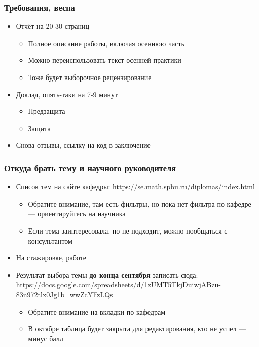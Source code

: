 \documentclass{../../slides-style}
\begin{document}
    \begin{frame}
        \frametitle{Требования, весна}
        \begin{itemize}
            \item Отчёт на 20-30 страниц
            \begin{itemize}
                \item Полное описание работы, включая осеннюю часть
                \item Можно переиспользовать текст осенней практики
                \item Тоже будет выборочное рецензирование
            \end{itemize}
            \item Доклад, опять-таки на 7-9 минут
            \begin{itemize}
                \item Предзащита
                \item Защита
            \end{itemize}
            \item Снова отзывы, ссылку на код в заключение
        \end{itemize}
    \end{frame}

    \begin{frame}
        \frametitle{Откуда брать тему и научного руководителя}
        \begin{itemize}
            \item Список тем на сайте кафедры: \url{https://se.math.spbu.ru/diplomas/index.html}
            \begin{itemize}
                \item Обратите внимание, там есть фильтры, но пока нет фильтра по кафедре --- ориентируйтесь на научника
                \item Если тема заинтересовала, но не подходит, можно пообщаться с консультантом
            \end{itemize}
            \item На стажировке, работе
            \item Результат выбора темы \textbf{до конца сентября} записать сюда: \url{https://docs.google.com/spreadsheets/d/1zUMT5TkjDuiwjABzu-83n972tlx0Jg1b_wwZcYFzLQs}
            \begin{itemize}
                \item Обратите внимание на вкладки по кафедрам
                \item В октябре таблица будет закрыта для редактирования, кто не успел --- минус балл
            \end{itemize}
        \end{itemize}
    \end{frame}
\end{document}
